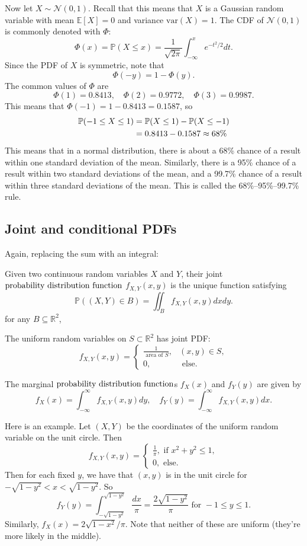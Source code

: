 \documentclass{ximera}
\begin{document}
Now let $X \sim \mathcal{N}(0,1)$. Recall that this means that $X$ is a Gaussian random variable with mean $\mathbb{E}[X]=0$ and variance $\mathrm{var}(X)=1$. The CDF of $\mathcal{N}(0,1)$ is commonly denoted with $\Phi$:
$$
\Phi(x) = \mathbb{P}(X \leq x) = \frac{1}{\sqrt{2\pi}} \int_{-\infty}^x e^{-t^2/2}dt.
$$
Since the PDF of $X$ is symmetric, note that
$$
\Phi(-y) = 1 - \Phi(y).
$$
The common values of $\Phi$ are
$$
\Phi(1) = 0.8413, \quad \Phi(2) = 0.9772, \quad \Phi(3) = 0.9987.
$$
This means that $\Phi(-1)=1-0.8413=0.1587$, so 
\begin{align*}
\mathbb{P}(-1 \leq X \leq 1) &= \mathbb{P}(X \leq 1) - \mathbb{P}(X \leq -1)\\
&= 0.8413-0.1587 \approx 68\%
\end{align*}
This means that in a normal distribution, there is about a 68\% chance of a result within one standard deviation of the mean. Similarly, there is a 95\% chance of a result within two standard deviations of the mean, and a 99.7\% chance of a result within three standard deviations of the mean. This is called the 68\%--95\%--99.7\% rule.


\subsection{Joint and conditional PDFs}
Again, replacing the sum with an integral:

\begin{definition}
Given two continuous random variables $X$ and $Y$, their joint $\text{probability distribution function}$ $f_{X,Y}(x,y)$ is the unique function satisfying
$$
\mathbb{P}((X,Y) \in B) = \iint_B f_{X,Y}(x,y) dx dy.
$$
for any $B\subseteq \mathbb{R}^2$,
\end{definition}

\begin{example}
The uniform random variables on $S\subset \mathbb{R}^2$ has joint PDF:
$$
f_{X,Y}(x,y)
= 
\begin{cases}
\frac{1}{\text{ area of } S}, & (x,y) \in S,\\
0,& \text{ else}.
\end{cases}
$$
\end{example}

\begin{definition}
The marginal $\text{probability distribution function}$s $f_X(x)$ and $f_Y(y)$ are given by 
$$
f_X(x) = \int_{-\infty}^{\infty} f_{X,Y}(x,y)dy, \quad f_Y(y) = \int_{-\infty}^{\infty} f_{X,Y}(x,y)dx.
$$
\end{definition}

Here is an example. Let $(X,Y)$ be the coordinates of the uniform random variable on the unit circle. Then
$$
f_{X,Y}(x,y)
= 
\begin{cases}
\frac{1}{\pi}, \text{ if } x^2 + y^2 \leq 1,\\
0, \text{ else. }
\end{cases}
$$
Then for each fixed $y$, we have that $(x,y)$ is in the unit circle for $-\sqrt{1-y^2} < x< \sqrt{1-y^2}$. So
$$
f_Y(y) = \int_{-\sqrt{1-y^2}}^{\sqrt{1-y^2}} \frac{dx}{\pi} = \frac{2\sqrt{1-y^2}}{\pi} \text{ for } -1\leq y \leq 1.
$$
Similarly, $f_X(x) = 2\sqrt{1-x^2}/\pi$. Note that neither of these are uniform (they're more likely in the middle).
\end{document}
